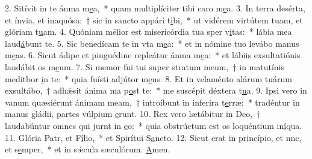 2. Sitívit in te ánma m\uline{e}a,~* quam multiplíciter tibi caro m\uline{e}a.
3. In terra desérta, et ínvia, et inaquósa:~† sic in sancto appári t\uline{i}bi,~* ut vidérem virtútem tuam, et glóriam t\uline{u}am.
4. Quóniam mélior est misericórdia tua sper v\uline{i}tas:~* lábia mea laud\uline{á}bunt te.
5. Sic benedícam te in vta m\uline{e}a:~* et in nómine tuo levábo manus m\uline{e}as.
6. Sicut ádipe et pinguédine repleátur ánma m\uline{e}a:~* et lábiis exsultatiónis laudábit os m\uline{e}um.
7. Si memor fui tui super stratum meum,~† in matutínis meditbor \uline{i}n te:~* quia fuísti adjútor m\uline{e}us.
8. Et in velaménto alárum tuárum exsultábo,~† adhǽsit ánima ma p\uline{o}st te:~* me suscépit déxtera t\uline{u}a.
9. Ipsi vero in vanum quæsiérunt ánimam meam,~† introíbunt in inferira t\uline{e}rræ:~* tradéntur in manus gládii, partes vúlpium \uline{e}runt.
10. Rex vero lætábitur in Deo,~† laudabúntur omnes qui jurnt in \uline{e}o:~* quia obstrúctum est os loquéntium in\uline{í}qua.
11. Glória Patr, et F\uline{í}lio,~* et Spirítui S\uline{a}ncto.
12. Sicut erat in princípio, et nnc, et s\uline{e}mper,~* et in sǽcula sæculórum. \uline{A}men.
